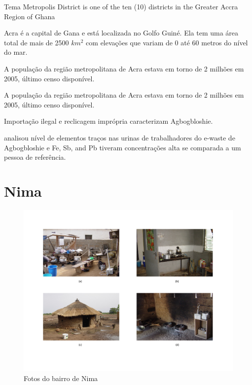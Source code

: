 Tema Metropolis District is one of the ten (10) districts in the Greater Accra Region of Ghana

Acra é a capital  de Gana e está localizada no Golfo Guiné. Ela tem uma área 
total de mais de 2500 $km^2$ com elevações que variam de 0 até 60 metros do nível 
do mar. 

A população da região metropolitana de Acra estava em torno de 2 milhões em 2005, 
último censo disponível.


A população da região metropolitana de Acra estava em torno de 2 milhões em 2005, 
último censo disponível.

Importação ilegal e reclicagem imprópria caracterizam Agbogbloshie.

\cite{asante2012} analisou nível de elementos traços nas urinas de trabalhadores 
do e-waste de Agbogbloshie e Fe, Sb, and Pb tiveram concentrações alta se comparada
a um pessoa de referência. 


\section{Nima}

\begin{figure}[H]
  \caption{Fotos do bairro de Nima}
  \includegraphics[scale=0.35]{../inputs/images/zheng/nima.pdf}
\end{figure}

